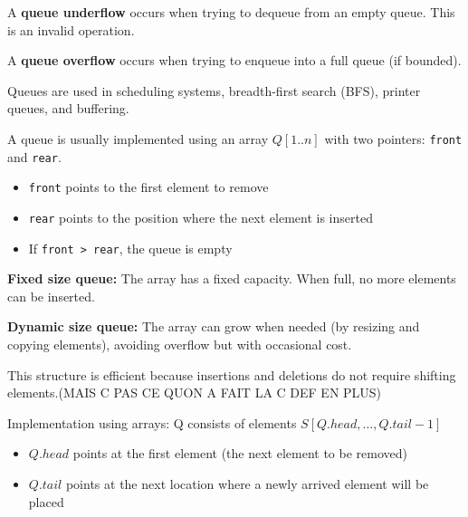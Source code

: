 \documentclass[11pt,a4paper,openany]{book}
\begin{document}
\begin{defnbox}[title=Queue underflow]
A \textbf{queue underflow} occurs when trying to dequeue from an empty queue.  
This is an invalid operation.
\end{defnbox}

\begin{defnbox}[title=Queue overflow]
A \textbf{queue overflow} occurs when trying to enqueue into a full queue (if bounded).
\end{defnbox}

\begin{defnbox}[title=Applications]
Queues are used in scheduling systems, breadth-first search (BFS), printer queues, and buffering.
\end{defnbox}

\begin{defnbox}[title=Queue implementation (how it is stored)]
A queue is usually implemented using an array $Q[1..n]$ with two pointers: \texttt{front} and \texttt{rear}.

\begin{itemize}
    \item \texttt{front} points to the first element to remove
    \item \texttt{rear} points to the position where the next element is inserted
    \item If \texttt{front > rear}, the queue is empty
\end{itemize}

\textbf{Fixed size queue:}
The array has a fixed capacity. When full, no more elements can be inserted.

\textbf{Dynamic size queue:}
The array can grow when needed (by resizing and copying elements), avoiding overflow but with occasional cost.

This structure is efficient because insertions and deletions do not require shifting elements.(MAIS C PAS CE QUON A FAIT LA C DEF EN PLUS)
\end{defnbox}


Implementation using arrays: Q consists of elements
$S[Q.head, \ldots, Q.tail - 1]$

\begin{itemize}
    \item $Q.head$ points at the first element (the next element to be removed)
    \item $Q.tail$ points at the next location where a newly arrived element will be placed
\end{itemize}
\end{document}

